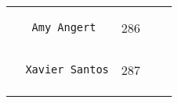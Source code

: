 \documentclass[]{article}
\begin{document}
\begin{longtable}[c]{@{}llll@{}}
\begin{minipage}[t]{0.39\columnwidth}
\begin{verbatim}
   Amy Angert
\end{verbatim}
\end{minipage} & \begin{minipage}[t]{0.10\columnwidth}\raggedright
286
\end{minipage} & \begin{minipage}[t]{0.13\columnwidth}\raggedright
\end{minipage} & \begin{minipage}[t]{0.15\columnwidth}\raggedright
\end{minipage}
\\\noalign{\medskip}
\begin{minipage}[t]{0.39\columnwidth}\raggedright
\begin{verbatim}
  Xavier Santos
\end{verbatim}
\end{minipage} & \begin{minipage}[t]{0.10\columnwidth}\raggedright
287
\end{minipage} & \begin{minipage}[t]{0.13\columnwidth}\raggedright
\end{minipage} & \begin{minipage}[t]{0.15\columnwidth}\raggedright
\end{minipage}
\\\noalign{\medskip}
\hline
\end{longtable}
\end{document}

